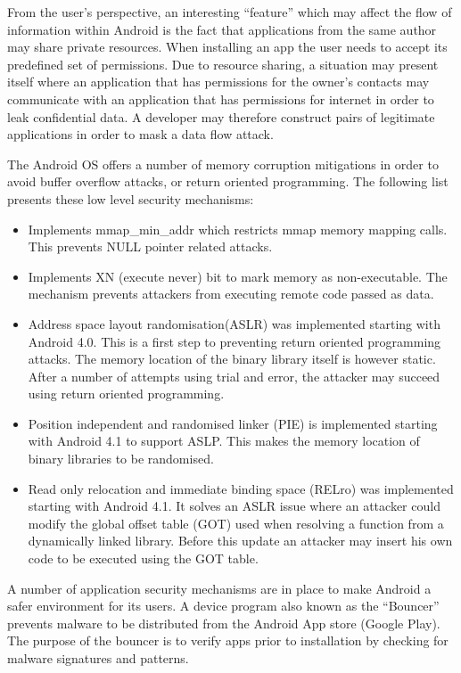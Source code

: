 From the user's perspective, an interesting ``feature'' which may affect the flow of information within Android is the fact that applications from the same author may share private resources. When installing an app the user needs to accept its predefined set of permissions. Due to resource sharing, a situation may present itself where an application that has permissions for the owner's contacts may communicate with an application that has permissions for internet in order to leak confidential data. A developer may therefore construct pairs of legitimate applications in order to mask a data flow attack.

The Android OS offers a number of memory corruption mitigations in order to avoid buffer overflow attacks, or return oriented programming. The following list 
presents these low level security mechanisms:
\begin{itemize}
	\item Implements mmap\_min\_addr which restricts mmap memory mapping calls. This prevents NULL pointer related attacks.
	\item Implements XN (execute never) bit to mark memory as non-executable. The mechanism prevents attackers from executing remote code passed as data.
	\item Address space layout randomisation(ASLR) was implemented starting with Android 4.0. This is a first step to preventing return oriented programming attacks. The memory location of the binary library itself is however static. After a number of attempts using trial and error, the attacker may succeed using return oriented programming.
	\item Position independent and randomised linker (PIE) is implemented starting with Android 4.1 to support ASLP. This makes the memory location of binary libraries to be randomised.
	\item Read only relocation and immediate binding space (RELro) was implemented starting with Android 4.1. It solves an ASLR issue where an attacker could modify the global offset table (GOT) used when resolving a function from a dynamically linked library. Before this update an attacker may insert his own code to be executed using the GOT table.
\end{itemize}

A number of application security mechanisms are in place to make Android a safer environment for its users. A device program also known as the ``Bouncer'' prevents malware to be distributed from the Android App store (Google Play). The purpose of the bouncer is to verify apps prior to installation by checking for malware signatures and patterns. 

